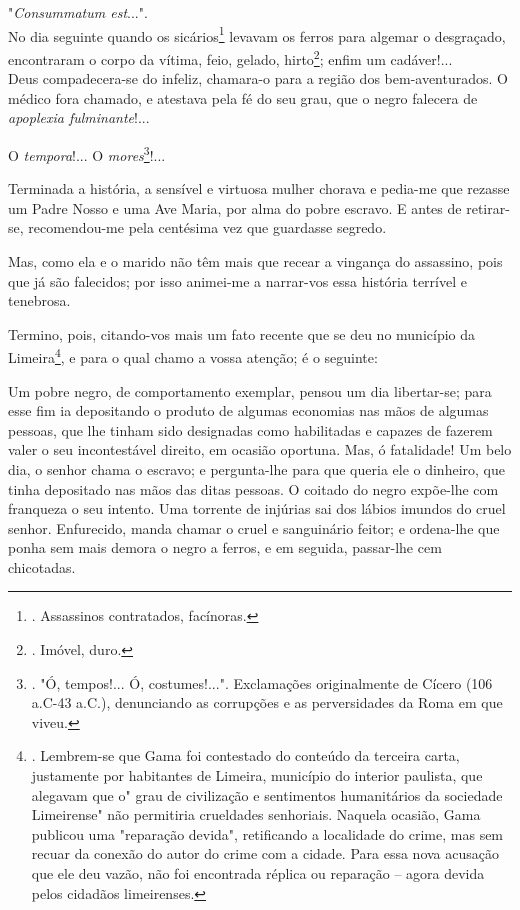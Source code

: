 "\emph{Consummatum est}...".\\
No dia seguinte quando os sicários\footnote{. Assassinos contratados,
  facínoras.} levavam os ferros para algemar o desgraçado, encontraram o
corpo da vítima, feio, gelado, hirto\footnote{. Imóvel, duro.}; enfim um
cadáver!...\\
Deus compadecera-se do infeliz, chamara-o para a região dos
bem-aventurados. O médico fora chamado, e atestava pela fé do seu grau,
que o negro falecera de \emph{apoplexia fulminante}!...

O \emph{tempora}!... O \emph{mores}\footnote{. "Ó, tempos!... Ó,
  costumes!...". Exclamações originalmente de Cícero (106 a.C-43 a.C.),
  denunciando as corrupções e as perversidades da Roma em que viveu.}!...

Terminada a história, a sensível e virtuosa mulher chorava e pedia-me
que rezasse um Padre Nosso e uma Ave Maria, por alma do pobre escravo. E
antes de retirar-se, recomendou-me pela centésima vez que guardasse
segredo.

Mas, como ela e o marido não têm mais que recear a vingança do
assassino, pois que já são falecidos; por isso animei-me a narrar-vos
essa história terrível e tenebrosa.

Termino, pois, citando-vos mais um fato recente que se deu no município
da Limeira\footnote{. Lembrem-se que Gama foi contestado do conteúdo da
  terceira carta, justamente por habitantes de Limeira, município do
  interior paulista, que alegavam que o" grau de civilização e
  sentimentos humanitários da sociedade Limeirense" não permitiria
  crueldades senhoriais. Naquela ocasião, Gama publicou uma "reparação
  devida", retificando a localidade do crime, mas sem recuar da conexão
  do autor do crime com a cidade. Para essa nova acusação que ele deu
  vazão, não foi encontrada réplica ou reparação -- agora devida pelos
  cidadãos limeirenses.}, e para o qual chamo a vossa atenção; é o
seguinte:

Um pobre negro, de comportamento exemplar, pensou um dia libertar-se;
para esse fim ia depositando o produto de algumas economias nas mãos de
algumas pessoas, que lhe tinham sido designadas como habilitadas e
capazes de fazerem valer o seu incontestável direito, em ocasião
oportuna. Mas, ó fatalidade! Um belo dia, o senhor chama o escravo; e
pergunta-lhe para que queria ele o dinheiro, que tinha depositado nas
mãos das ditas pessoas. O coitado do negro expõe-lhe com franqueza o seu
intento. Uma torrente de injúrias sai dos lábios imundos do cruel
senhor. Enfurecido, manda chamar o cruel e sanguinário feitor; e
ordena-lhe que ponha sem mais demora o negro a ferros, e em seguida,
passar-lhe cem chicotadas.

